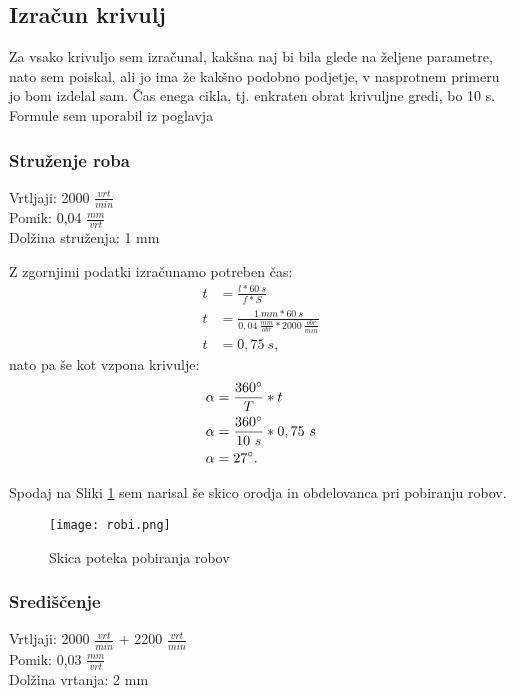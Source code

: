 \subsection{Izračun krivulj}
Za vsako krivuljo sem izračunal, kakšna naj bi bila glede na
željene parametre, nato sem poiskal, ali jo ima že kakšno podobno
podjetje, v nasprotnem primeru jo bom izdelal sam.
Čas enega cikla, tj. enkraten obrat krivuljne gredi, bo 10 s.
Formule sem uporabil iz poglavja 

\subsubsection{Struženje roba}
Vrtljaji: 2000 \( \frac{vrt}{min} \) \\
Pomik: 0,04 \( \frac{mm}{vrt} \) \\
Dolžina struženja: 1 mm

Z zgornjimi podatki izračunamo potreben čas:
\begin{equation}
	\begin{split}
		t &= \frac{l*60\ s}{f*S} \\
		t &= \frac{1\ mm*60\ s}{0,04\ \frac{mm}{obr}*2000\ \frac{obr}{min}} \\
		t &= 0,75\ s,
	\end{split}
\end{equation}
nato pa še kot vzpona krivulje:
\begin{equation}
	\begin{split}
		\alpha &= \frac{360\degree}{T} * t \\
		\alpha &= \frac{360\degree}{10\ s} * 0,75\ s\\
		\alpha &= 27\degree.
	\end{split}
\end{equation}

Spodaj na Sliki \ref{shema_robov} sem narisal še skico orodja
in obdelovanca pri pobiranju robov.
\begin{figure}[H]
	\begin{center}
		\texttt{[image: robi.png]}
		\caption{Skica poteka pobiranja robov
			\cite{lasten}}
		\label{shema_robov}
	\end{center}
\end{figure}

\subsubsection{Središčenje}
Vrtljaji: 2000 \( \frac{vrt}{min} \) + 2200 \( \frac{vrt}{min} \)\\
Pomik: 0,03 \( \frac{mm}{vrt} \) \\
Dolžina vrtanja: 2 mm


